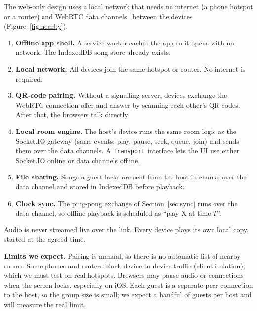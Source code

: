 \documentclass[11pt,a4paper]{article}
\begin{document}
The web-only design uses a local network that needs no internet (a phone hotspot or a
router) and WebRTC data channels~\cite{webrtc,rtcdc} between the devices (Figure~\ref{fig:nearby}).
\begin{enumerate}
  \item \textbf{Offline app shell.} A service worker caches the app so it opens with no
        network. The IndexedDB song store already exists.
  \item \textbf{Local network.} All devices join the same hotspot or router. No internet is
        required.
  \item \textbf{QR-code pairing.} Without a signalling server, devices exchange the WebRTC
        connection offer and answer by scanning each other's QR codes. After that, the
        browsers talk directly.
  \item \textbf{Local room engine.} The host's device runs the same room logic as the
        Socket.IO gateway (same events: play, pause, seek, queue, join) and sends them over
        the data channels. A \texttt{Transport} interface lets the UI use either Socket.IO
        online or data channels offline.
  \item \textbf{File sharing.} Songs a guest lacks are sent from the host in chunks over the
        data channel and stored in IndexedDB before playback.
  \item \textbf{Clock sync.} The ping-pong exchange of Section~\ref{sec:sync} runs over the
        data channel, so offline playback is scheduled as ``play X at time $T$''.
\end{enumerate}
Audio is never streamed live over the link. Every device plays its own local copy,
started at the agreed time.

\textbf{Limits we expect.} Pairing is manual, so there is no automatic list of nearby
rooms. Some phones and routers block device-to-device traffic (client isolation), which we
must test on real hotspots. Browsers may pause audio or connections when the screen locks,
especially on iOS. Each guest is a separate peer connection to the host, so the group
size is small; we expect a handful of guests per host and will measure the real limit.
\end{document}
